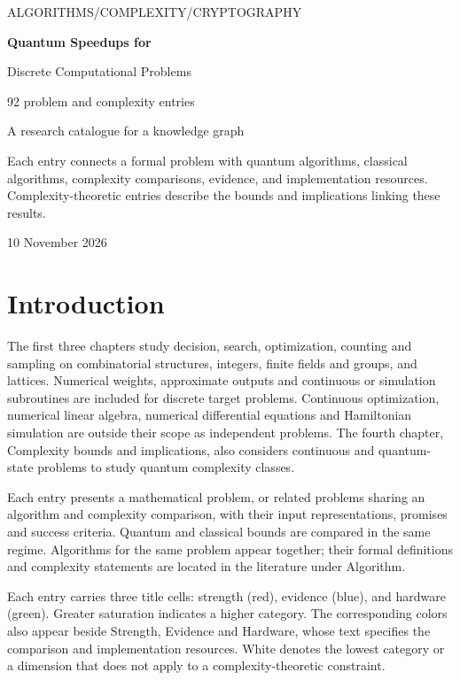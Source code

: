 \documentclass[11pt,a4paper]{article}
\theoremstyle{problemstyle}
\begin{document}
\begin{titlepage}
\vspace*{24mm}
{\small ALGORITHMS\quad /\quad COMPLEXITY\quad /\quad CRYPTOGRAPHY\par}
\vspace{14mm}
{\Huge\bfseries Quantum Speedups for\par Discrete Computational Problems\par}
\vspace{12mm}
{\Large 92 problem and complexity entries\par}
\vspace{10mm}
{\large A research catalogue for a knowledge graph\par}
\vfill
Each entry connects a formal problem with quantum algorithms, classical algorithms, complexity comparisons, evidence, and implementation resources. Complexity-theoretic entries describe the bounds and implications linking these results.\par
\vspace{20mm}
{\large 10 November 2026\par}
\end{titlepage}

\section*{Introduction}
The first three chapters study decision, search, optimization, counting and sampling on combinatorial structures, integers, finite fields and groups, and lattices. Numerical weights, approximate outputs and continuous or simulation subroutines are included for discrete target problems. Continuous optimization, numerical linear algebra, numerical differential equations and Hamiltonian simulation are outside their scope as independent problems. The fourth chapter, Complexity bounds and implications, also considers continuous and quantum-state problems to study quantum complexity classes.

Each entry presents a mathematical problem, or related problems sharing an algorithm and complexity comparison, with their input representations, promises and success criteria. Quantum and classical bounds are compared in the same regime. Algorithms for the same problem appear together; their formal definitions and complexity statements are located in the literature under Algorithm.

Each entry carries three title cells: strength (red), evidence (blue), and hardware (green). Greater saturation indicates a higher category. The corresponding colors also appear beside Strength, Evidence and Hardware, whose text specifies the comparison and implementation resources. White denotes the lowest category or a dimension that does not apply to a complexity-theoretic constraint.
\end{document}
